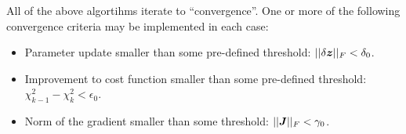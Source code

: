 \documentclass[useAMS,usenatbib]{mn2e}
\newcommand{\mat}[1]{{\bmath{#1}}}
\newcommand{\JJ}{\mat{J}} %
\numberwithin{equation}{section} %
\begin{document}
All of the above algortihms iterate to ``convergence''. One or more of the following convergence criteria may be implemented in each case:

\begin{itemize}
\item Parameter update smaller than some pre-defined threshold: $||\delta \bmath{z}||_F<\delta_0$.
\item Improvement to cost function smaller than some pre-defined threshold: $\chi^2_{k-1}-\chi^2_{k}<\epsilon_0$.
\item Norm of the gradient smaller than some threshold:  $||\JJ||_F<\gamma_0$.
\end{itemize}




\label{lastpage}
\end{document}
